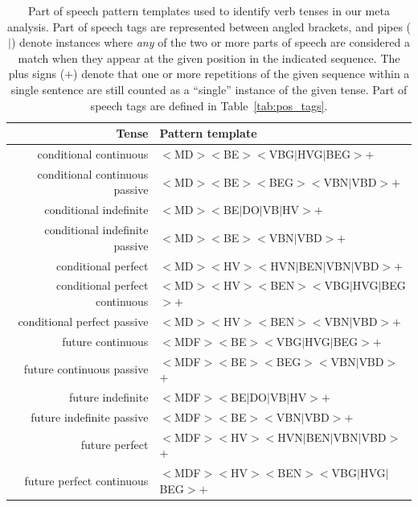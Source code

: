 \documentclass[10pt]{article}
\begin{document}
\begin{table}
    \footnotesize
    \centering

    \caption{Part of speech pattern templates used to identify verb tenses in
    our meta analysis. Part of speech tags are represented between angled
    brackets, and pipes ($|$) denote instances where \textit{any} of the two or
    more parts of speech are considered a match when they appear at the given
    position in the indicated sequence. The plus signs ($+$) denote that one or
    more repetitions of the given sequence within a single sentence are still
    counted as a ``single'' instance of the given tense. Part of speech tags
    are defined in Table~\ref{tab:pos_tags}.}

    \begin{tabular}{r|l}
    \toprule
      \textbf{Tense} & \textbf{Pattern template} \\
      \midrule
      conditional continuous & $<$MD$>$$<$BE$>$$<$VBG$|$HVG$|$BEG$>$$+$ \\
      \midrule
      conditional continuous passive & $<$MD$>$$<$BE$>$$<$BEG$>$$<$VBN$|$VBD$>$$+$ \\
      \midrule
      conditional indefinite & $<$MD$>$$<$BE$|$DO$|$VB$|$HV$>$$+$ \\
      \midrule
      conditional indefinite passive & $<$MD$>$$<$BE$>$$<$VBN$|$VBD$>$$+$ \\
      \midrule
      conditional perfect & $<$MD$>$$<$HV$>$$<$HVN$|$BEN$|$VBN$|$VBD$>$$+$ \\
      \midrule
      conditional perfect continuous & $<$MD$>$$<$HV$>$$<$BEN$>$$<$VBG$|$HVG$|$BEG$>$$+$ \\
      \midrule
      conditional perfect passive & $<$MD$>$$<$HV$>$$<$BEN$>$$<$VBN$|$VBD$>$$+$ \\
      \midrule
      future continuous & $<$MDF$>$$<$BE$>$$<$VBG$|$HVG$|$BEG$>$$+$ \\
      \midrule
      future continuous passive & $<$MDF$>$$<$BE$>$$<$BEG$>$$<$VBN$|$VBD$>$$+$ \\
      \midrule
      future indefinite & $<$MDF$>$$<$BE$|$DO$|$VB$|$HV$>$$+$ \\
      \midrule
      future indefinite passive & $<$MDF$>$$<$BE$>$$<$VBN$|$VBD$>$$+$ \\
      \midrule
      future perfect & $<$MDF$>$$<$HV$>$$<$HVN$|$BEN$|$VBN$|$VBD$>$$+$ \\
      \midrule
      future perfect continuous & $<$MDF$>$$<$HV$>$$<$BEN$>$$<$VBG$|$HVG$|$BEG$>$$+$ \\

\end{tabular}
\end{table}
\end{document}
